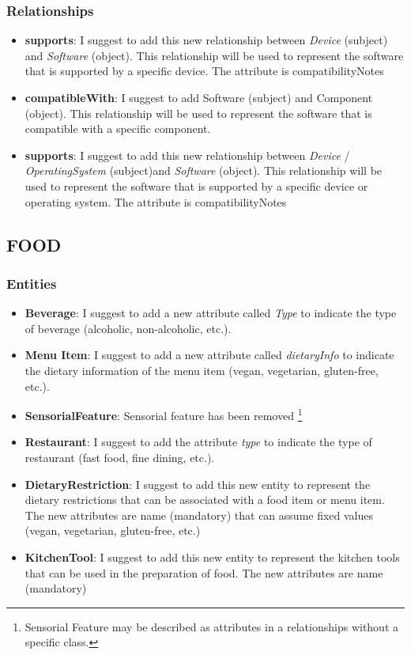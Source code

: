 \subsubsection{Relationships}
\begin{itemize}
\item \textbf{supports}: I suggest to add this new relationship between \textit{Device} (subject) and \textit{Software} (object). This relationship will be used to represent the software that is supported by a specific device. The attribute is compatibilityNotes
\item \textbf{compatibleWith}: I suggest to add Software (subject) and Component (object). This relationship will be used to represent the software that is compatible with a specific component.
\item \textbf{supports}: I suggest to add this new relationship between \textit{Device} / \textit{OperatingSystem} (subject)and \textit{Software} (object). This relationship will be used to represent the software that is supported by a specific device or operating system. The attribute is compatibilityNotes
\end{itemize}

\subsection{FOOD}
\subsubsection{Entities}
\begin{itemize}
    \item \textbf{Beverage}: I suggest to add a new attribute called \textit{Type} to indicate the type of beverage (alcoholic, non-alcoholic, etc.).
    \item \textbf{Menu Item}: I suggest to add a new attribute called \textit{dietaryInfo} to indicate the dietary information of the menu item (vegan, vegetarian, gluten-free, etc.).
    \item \textbf{SensorialFeature}: Sensorial feature has been removed \footnote{Sensorial Feature may be described as attributes in a relationships without a specific class.}
    \item \textbf{Restaurant}: I suggest to add the attribute \textit{type} to indicate the type of restaurant (fast food, fine dining, etc.).
    \item \textbf{DietaryRestriction}: I suggest to add this new entity to represent the dietary restrictions that can be associated with a food item or menu item. The new attributes are name (mandatory) that can assume fixed values (vegan, vegetarian, gluten-free, etc.) 
    \item \textbf{KitchenTool}: I suggest to add this new entity to represent the kitchen tools that can be used in the preparation of food. The new attributes are name (mandatory)
\end{itemize}


